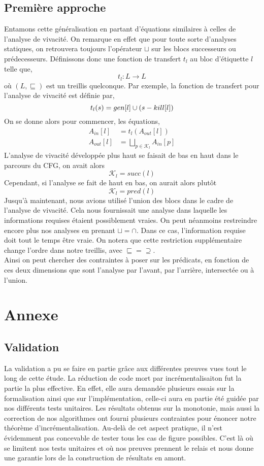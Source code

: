 \documentclass[a4paper, 10pt]{article}
\begin{document}
\subsection{Première approche}
Entamons cette généralisation en partant d'équations similaires à celles de l'analyse de vivacité.
On remarque en effet que pour toute sorte d'analyses statiques, on retrouvera toujours l'opérateur $\sqcup$
sur les blocs successeurs ou prédecesseurs. Définissons donc une fonction de transfert $t_l$ au bloc d'étiquette $l$
telle que,
\[
	t_l : L \longrightarrow L	
\]
où $(L, \sqsubseteq)$ est un treillis quelconque. Par exemple, la fonction de transfert pour l'analyse de vivacité est définie par,
\[
	t_l(s) = gen[l] \cup (s - kill[l])	
\] 
On se donne alors pour commencer, les équations,
\begin{align*}
	A_{in}[l] &= t_l(A_{out}[l])\\
	A_{out}[l]&= \bigsqcup\limits_{p \in \mathcal{K}_l} A_{in}[p]
\end{align*}
L'analyse de vivacité développée plus haut se faisait de bas en haut dans le parcours du CFG, on avait alors
\[\mathcal{K}_l = succ(l)\] 
Cependant, si l'analyse se fait de haut en bas, on aurait alors plutôt
\[\mathcal{K}_l = pred(l)\]
Jusqu'à maintenant, nous avions utilisé l'union des blocs dans le cadre de l'analyse de vivacité. Cela nous fournissait
une analyse dans laquelle les informations requises étaient possiblement vraies. On peut néanmoins restreindre encore plus
nos analyses en prenant $\sqcup=\cap$. Dans ce cas, l'information requise doit tout le temps être vraie. On notera que cette
restriction supplémentaire change l'ordre dans notre treillis, avec $\sqsubseteq=\supseteq$.
\\
Ainsi on peut chercher des contraintes à poser sur les prédicats, en fonction de ces deux dimensions que sont l'analyse par
l'avant, par l'arrière, intersectée ou à l'union.
\section{Annexe}
\subsection{Validation}
La validation a pu se faire en partie grâce aux différentes preuves vues tout le long de cette étude.
La réduction de code mort par incrémentalisaiton fut la partie la plus effective. En effet, elle aura demandée plusieurs essais
sur la formalisation ainsi que sur l'implémentation, celle-ci aura en partie été guidée par nos différents tests unitaires.
Les résultats obtenus sur la monotonie, mais aussi la correction de nos algorithmes ont fourni plusieurs contraintes pour
énoncer notre théorème d'incrémentalisation. Au-delà de cet aspect pratique, il n'est évidemment pas concevable de tester tous 
les cas de figure possibles. C'est là où se limitent nos tests unitaires et où nos preuves prennent le relais et nous donne une
garantie lors de la construction de résultats en amont.
\end{document}
